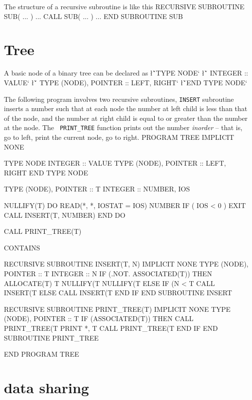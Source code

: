 {{The structure of a recursive subroutine is like this
\ttbg
RECURSIVE SUBROUTINE SUB( ... )
   ...
   CALL SUB( ... )
   ...
END SUBROUTINE SUB
\tted

\section{Tree}
A basic node of a binary tree can be declared as
\sms
\l{\v`TYPE NODE`}
\l{\v`   INTEGER :: VALUE`}
\l{\v`   TYPE (NODE), POINTER :: LEFT, RIGHT`}
\l{\v`END TYPE NODE`\m{}}
\sms

The following program involves two recursive subroutines, {\tt INSERT} 
subroutine inserts a number such that at each node the number
at left child is less than that of the node, and the number at right
child is equal to or greater than the number at the node. The {\tt
PRINT\_TREE} function prints out the number {\sl inorder} -- that is, go to
left, print the current node, go to right.
\ttbg
PROGRAM TREE
   IMPLICIT NONE

   TYPE NODE
      INTEGER :: VALUE
      TYPE (NODE), POINTER :: LEFT, RIGHT
   END TYPE NODE

   TYPE (NODE), POINTER :: T
   INTEGER :: NUMBER, IOS
   
   NULLIFY(T)
   DO 
      READ(*, *, IOSTAT = IOS) NUMBER
      IF ( IOS < 0 ) EXIT
      CALL INSERT(T, NUMBER)
   END DO

   CALL PRINT_TREE(T)

CONTAINS

RECURSIVE SUBROUTINE INSERT(T, N)
   IMPLICIT NONE
   TYPE (NODE), POINTER :: T
   INTEGER :: N
   IF (.NOT. ASSOCIATED(T)) THEN
      ALLOCATE(T)
      T%
      NULLIFY(T%
      NULLIFY(T%
   ELSE IF (N < T%
      CALL INSERT(T%
   ELSE
      CALL INSERT(T%
   END IF
END SUBROUTINE INSERT

RECURSIVE SUBROUTINE PRINT_TREE(T)
   IMPLICIT NONE
   TYPE (NODE), POINTER :: T
   IF (ASSOCIATED(T)) THEN 
      CALL PRINT_TREE(T%
      PRINT *, T%
      CALL PRINT_TREE(T%
   END IF
END SUBROUTINE PRINT_TREE

END PROGRAM TREE
\tted


\section{data sharing}

}}
